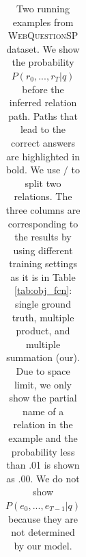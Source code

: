 \begin{table}[t]
{\begin{tabular}{l|l|l}
\end{tabular}
}\caption{\fontsize{10}{12}\selectfont Two running examples from \textsc{WebQuestionSP} dataset. We show the probability $P(r_0,...,r_T|q)$ before the inferred relation path. Paths that lead to the correct answers are highlighted in bold. We use $/$ to split two relations. The three columns are corresponding to the results by using different training settings as it is in Table \ref{tab:obj_fcn}: single ground truth, multiple product, and multiple summation (our). Due to space limit, we only show the partial name of a relation in the example and the probability less than .01 is shown as .00. We do not show $P(e_0,...,e_{T-1}|q)$ because they are not determined by our model. }\label{tab:case}
\end{table}